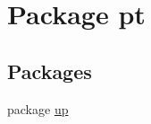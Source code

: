 \hypertarget{namespacept}{}\section{Package pt}
\label{namespacept}
\subsection*{Packages}
\begin{DoxyCompactItemize}
\item 
package \hyperlink{namespacept_1_1up}{up}
\end{DoxyCompactItemize}
